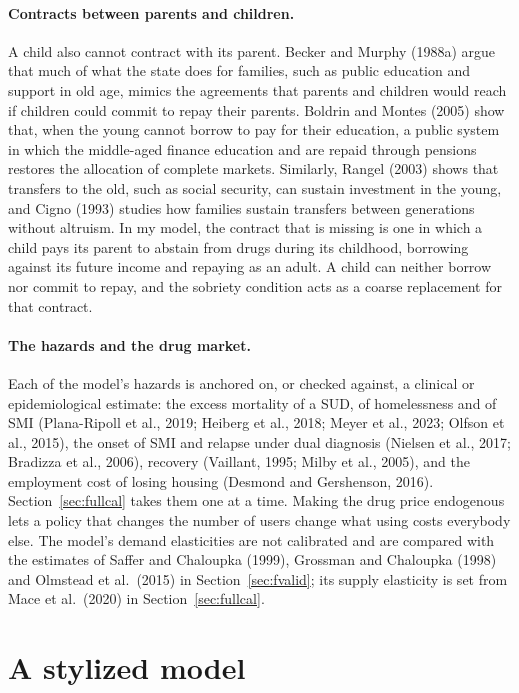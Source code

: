 \documentclass[10pt]{article}
\begin{document}
\paragraph{Contracts between parents and children.} A child also cannot contract with its parent. Becker and Murphy (1988a) argue that much of what the state does for families, such as public education and support in old age, mimics the agreements that parents and children would reach if children could commit to repay their parents. Boldrin and Montes (2005) show that, when the young cannot borrow to pay for their education, a public system in which the middle-aged finance education and are repaid through pensions restores the allocation of complete markets. Similarly, Rangel (2003) shows that transfers to the old, such as social security, can sustain investment in the young, and Cigno (1993) studies how families sustain transfers between generations without altruism. In my model, the contract that is missing is one in which a child pays its parent to abstain from drugs during its childhood, borrowing against its future income and repaying as an adult. A child can neither borrow nor commit to repay, and the sobriety condition acts as a coarse replacement for that contract.

\paragraph{The hazards and the drug market.} Each of the model's hazards is anchored on, or checked against, a clinical or epidemiological estimate: the excess mortality of a SUD, of homelessness and of SMI (Plana-Ripoll et al., 2019; Heiberg et al., 2018; Meyer et al., 2023; Olfson et al., 2015), the onset of SMI and relapse under dual diagnosis (Nielsen et al., 2017; Bradizza et al., 2006), recovery (Vaillant, 1995; Milby et al., 2005), and the employment cost of losing housing (Desmond and Gershenson, 2016). Section~\ref{sec:fullcal} takes them one at a time. Making the drug price endogenous lets a policy that changes the number of users change what using costs everybody else. The model's demand elasticities are not calibrated and are compared with the estimates of Saffer and Chaloupka (1999), Grossman and Chaloupka (1998) and Olmstead et al.\ (2015) in Section~\ref{sec:fvalid}; its supply elasticity is set from Mace et al.\ (2020) in Section~\ref{sec:fullcal}.


\section{A stylized model}\label{sec:stylized}
\end{document}
